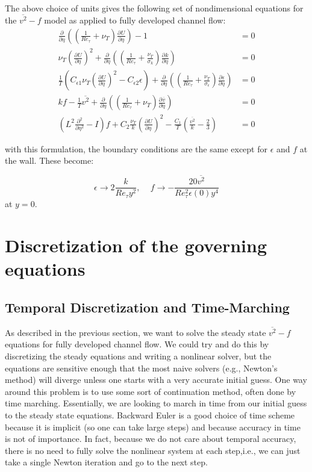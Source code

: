 \documentclass[a4paper,11pt]{article}
\newcommand{\pderiv}[3][]{%
  \ensuremath{\frac{\partial^{#1} {#2}}{\partial {#3}^{#1}}}}
\newcommand{\noi}{\noindent}
\newcommand{\ep}{\epsilon}
\begin{document}
\noi The above choice of units gives the following set of nondimensional equations for the
$\overline{v^2}-f$ model as applied to fully developed channel flow: 
\begin{align}
	\label{eq:ssv2f1_nondim}
\pderiv{}{\eta}\left(\left(\frac{1}{Re_{\tau}}+\nu_T\right)\pderiv{U}{\eta}\right)
-1 &= 0\\
       \nu_T\left(\pderiv{U}{\eta}\right)^2 + 
\pderiv{}{\eta}\left(\left(\frac{1}{Re_{\tau}}+\frac{\nu_T}{\sigma_k}\right)\pderiv{k}{\eta}\right)
&=0\\
       \frac{1}{T}\left(C_{\ep
1}\nu_T\left(\pderiv{U}{\eta}\right)^2 - C_{\ep 2}\ep\right) + 
\pderiv{}{\eta}\left(\left(\frac{1}{Re_{\tau}}+\frac{\nu_T}{\sigma_\ep}\right)\pderiv{\ep}{\eta}\right)&=0 \\
       kf - \frac{1}{T}\overline{v^2} +
\pderiv{}{\eta}\left(\left(\frac{1}{Re_{\tau}}+\nu_T\right)\pderiv{\overline{v}}{\eta}\right)
&=0\\
       \left( L^2 \frac{\partial^2}{\partial \eta^2} - I\right)f +
C_2\frac{\nu_T}{k}\left(\pderiv{U}{\eta}\right)^2 -
\frac{C_1}{T}\left(\frac{\overline{v^2}}{k}-\frac{2}{3}\right) &=0
	\label{eq:ssv2f5_nondim}
\end{align}

\noi with this formulation, the boundary conditions are the same except for
$\epsilon$ and $f$ at the wall. These become:  

\[
\epsilon \to 2\frac{k}{Re_{\tau}y^2}, \,\,\,\,\,\,\, f \to -\frac{20
\overline{v^2} }{Re_\tau^2 \ep(0) y^4}
\]
at $y = 0$.  

\section{Discretization of the governing equations}

\subsection{Temporal Discretization and Time-Marching}
As described in the previous section, we want to solve the steady state
$\overline{v^2}-f$ equations for fully developed channel flow. We could try and
do this by discretizing the steady equations and writing a nonlinear solver, but
the equations are sensitive enough that the most naive solvers (e.g., Newton's
method) will diverge unless one starts with a very accurate initial guess. One
way around this problem is to use some sort of continuation method, often done
by time marching. Essentially, we are looking to march in time from our initial
guess to the steady state equations. Backward Euler is a good choice of time
scheme because it is implicit (so one can take large steps) and because accuracy
in time is not of importance. In fact, because we do not care about temporal
accuracy, there is no need to fully solve the nonlinear system at each
step,i.e., we can just take a single Newton iteration and go to the next step.
\end{document}

